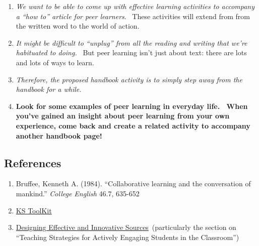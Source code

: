 \begin{enumerate}
\item
  \emph{We want to be able to come up with effective learning
  activities to accompany a ``how to'' article for peer
  learners}. ~These activities will extend from from the written word
  to the world of action.
\item
  \emph{It might be difficult to ``unplug'' from all the reading and
  writing that we're habituated to doing.} ~But peer learning isn't
  just about text: there are lots and lots of ways to learn.
\item
  \emph{Therefore, the proposed handbook activity is to simply step away from the
  handbook for a while.}
\item[] \textbf{Look for some examples of peer learning in
  everyday life.~ When you've gained an insight about peer learning
  from your own experience, come back and create a related activity to
  accompany another handbook page!}
\end{enumerate}

\subsection{References}

\begin{enumerate}
\itemsep1pt\parskip0pt
\item
  Bruffee, Kenneth A. (1984). ``Collaborative learning and the
  conversation of mankind.'' \emph{College English} 46.7, 635-652
\item
  \href{http://www.kstoolkit.org/KS+Methods}{KS ToolKit}
\item
  \href{http://serc.carleton.edu/NAGTWorkshops/coursedesign/tutorial/strategies.html}{Designing
  Effective and Innovative Sources}~(particularly the section on
  ``Teaching Strategies for Actively Engaging Students in the
  Classroom'')
\end{enumerate}
